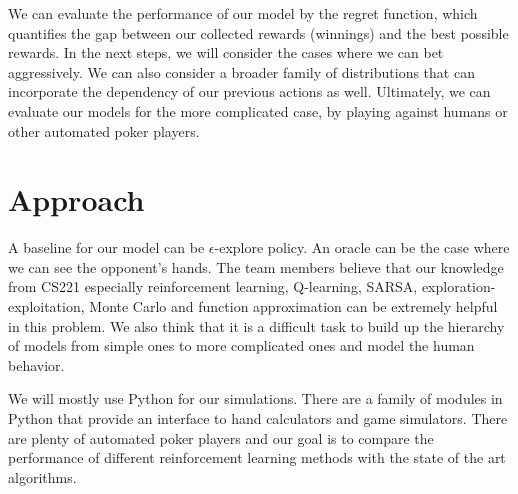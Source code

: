 We can evaluate the performance of our model by the regret function, which
quantifies the gap between our collected rewards (winnings) and the best possible rewards.
In the next steps, we will consider the cases where we can bet aggressively. We can also 
consider a broader family of distributions that can incorporate the dependency of our previous 
actions as well. 
Ultimately, we can evaluate our models for the more complicated case, by playing against
humans or other automated poker players.

\section{Approach}
A baseline for our model can be $\epsilon$-explore policy. An oracle can be the case where 
we can see the opponent's hands. The team members believe that our knowledge from 
CS221 especially reinforcement learning, Q-learning, SARSA, exploration-exploitation,
Monte Carlo and function approximation can be extremely helpful in this problem. We
also think that it is a difficult task to build up the hierarchy of models from simple ones
to more complicated ones and model the human behavior. 

We will mostly use Python for our simulations. There are a family of modules 
in Python that provide an interface to hand calculators and game simulators. 
There are plenty of automated poker players and our goal is to compare the performance
of different reinforcement learning methods with the state of the art algorithms. 